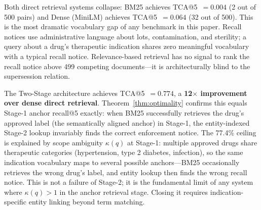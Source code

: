 \documentclass[11pt]{article}
\begin{document}
\begin{table}[h]
\centering
\small
{}
\caption{End-to-End retrieval on 500 FDA drug recall pairs (3,000-document corpus). BM25 and Dense (MiniLM) collapse (TCA@5 $\leq 0.064$, 95\% CI upper bound $\leq 0.089$): therapeutic indication vocabulary has near-zero overlap with recall enforcement vocabulary. Two-Stage TCA@5 equals Stage-1 anchor recall@5 exactly (Theorem~\ref{thm:optimality}); the 95\% CI [0.735, 0.808] reflects the indication ambiguity at Stage-1: multiple drugs share therapeutic categories, and Stage-1 errors cannot be remedied by entity-indexed Stage-2. Artifact: \texttt{data/fda\_recall\_pairs.json}, \texttt{data/fda\_recall\_results.json}.}
\label{tab:fda_realworld}
\end{table}

Both direct retrieval systems collapse: BM25 achieves TCA@5~$= 0.004$ (2 out of 500 pairs) and Dense (MiniLM) achieves TCA@5~$= 0.064$ (32 out of 500). This is the most dramatic vocabulary gap of any benchmark in this paper. Recall notices use administrative language about lots, contamination, and sterility; a query about a drug's therapeutic indication shares zero meaningful vocabulary with a typical recall notice. Relevance-based retrieval has no signal to rank the recall notice above 499 competing documents---it is architecturally blind to the supersession relation.

The Two-Stage architecture achieves TCA@5~$= 0.774$, a \textbf{12$\times$ improvement over dense direct retrieval}. Theorem~\ref{thm:optimality} confirms this equals Stage-1 anchor recall@5 exactly: when BM25 successfully retrieves the drug's approved label (the semantically aligned anchor) in Stage-1, the entity-indexed Stage-2 lookup invariably finds the correct enforcement notice. The 77.4\% ceiling is explained by scope ambiguity $\kappa(q)$ at Stage-1: multiple approved drugs share therapeutic categories (hypertension, type 2 diabetes, infection), so the same indication vocabulary maps to several possible anchors---BM25 occasionally retrieves the wrong drug's label, and entity lookup then finds the wrong recall notice. This is not a failure of Stage-2; it is the fundamental limit of any system where $\kappa(q) > 1$ in the anchor retrieval stage. Closing it requires indication-specific entity linking beyond term matching.
\end{document}
